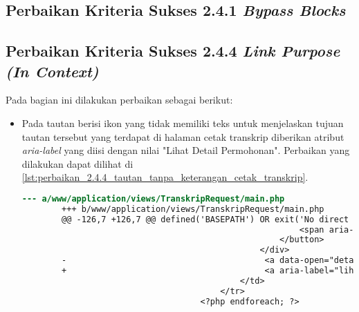 \subsection{Perbaikan Kriteria Sukses 2.4.1 \textit{Bypass Blocks}}
\label{subsec:perbaikan_kriteria_sukses_2.4.1}

\subsection{Perbaikan Kriteria Sukses 2.4.4 \textit{Link Purpose (In Context)}}
\label{subsec:perbaikan_kriteria_sukses_2.4.4}
Pada bagian ini dilakukan perbaikan sebagai berikut:

\begin{itemize}
    \item Pada tautan berisi ikon yang tidak memiliki teks untuk menjelaskan tujuan tautan tersebut yang terdapat di halaman cetak transkrip diberikan atribut \textit{aria-label} yang diisi dengan nilai "Lihat Detail Permohonan". Perbaikan yang dilakukan dapat dilihat di \ref{lst:perbaikan_2.4.4_tautan_tanpa_keterangan_cetak_transkrip}.
    \begin{lstlisting}[frame=single, label={lst:perbaikan_2.4.4_tautan_tanpa_keterangan_cetak_transkrip}, language=diff, caption=Perbaikan Kriteria Sukses 2.4.4 - Tautan Tanpa Keterangan di Halaman Manajemen Cetak Transkrip]
        --- a/www/application/views/TranskripRequest/main.php
        +++ b/www/application/views/TranskripRequest/main.php
        @@ -126,7 +126,7 @@ defined('BASEPATH') OR exit('No direct script access allowed');
                                                        <span aria-hidden="true">&times;</span>
                                                    </button>
                                                </div>
        -                                        <a data-open="detail<?= $request->id ?>"><i class="fi-eye"></i></a>
        +                                        <a aria-label="lihat detail permohonan" data-open="detail<?= $request->id ?>"><i class="fi-eye"></i></a>
                                            </td>
                                        </tr>
                                    <?php endforeach; ?>
    \end{lstlisting}


\end{itemize}
